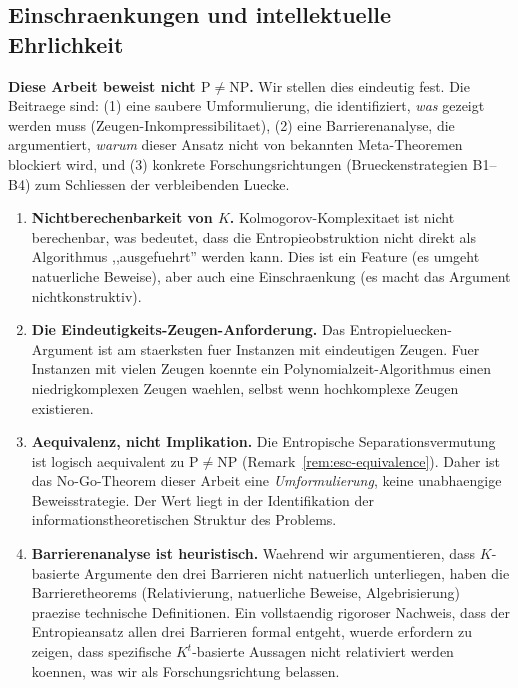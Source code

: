 \documentclass[aps,prd,twocolumn,superscriptaddress,nofootinbib]{revtex4-2}
\theoremstyle{definition}
\theoremstyle{remark}
\newcommand{\NP}{\mathrm{NP}}
\newcommand{\PP}{\mathrm{P}}
\begin{document}
\subsection{Einschraenkungen und intellektuelle Ehrlichkeit}

\textbf{Diese Arbeit beweist nicht $\PP \neq \NP$.} Wir stellen dies eindeutig fest. Die Beitraege sind: (1) eine saubere Umformulierung, die identifiziert, \textit{was} gezeigt werden muss (Zeugen-Inkompressibilitaet), (2) eine Barrierenanalyse, die argumentiert, \textit{warum} dieser Ansatz nicht von bekannten Meta-Theoremen blockiert wird, und (3) konkrete Forschungsrichtungen (Brueckenstrategien B1--B4) zum Schliessen der verbleibenden Luecke.

\begin{enumerate}
\item \textbf{Nichtberechenbarkeit von $K$.} Kolmogorov-Komplexitaet ist nicht berechenbar, was bedeutet, dass die Entropieobstruktion nicht direkt als Algorithmus ,,ausgefuehrt'' werden kann. Dies ist ein Feature (es umgeht natuerliche Beweise), aber auch eine Einschraenkung (es macht das Argument nichtkonstruktiv).

\item \textbf{Die Eindeutigkeits-Zeugen-Anforderung.} Das Entropieluecken-Argument ist am staerksten fuer Instanzen mit eindeutigen Zeugen. Fuer Instanzen mit vielen Zeugen koennte ein Polynomialzeit-Algorithmus einen niedrigkomplexen Zeugen waehlen, selbst wenn hochkomplexe Zeugen existieren.

\item \textbf{Aequivalenz, nicht Implikation.} Die Entropische Separationsvermutung ist logisch aequivalent zu $\PP \neq \NP$ (Remark~\ref{rem:esc-equivalence}). Daher ist das No-Go-Theorem dieser Arbeit eine \textit{Umformulierung}, keine unabhaengige Beweisstrategie. Der Wert liegt in der Identifikation der informationstheoretischen Struktur des Problems.

\item \textbf{Barrierenanalyse ist heuristisch.} Waehrend wir argumentieren, dass $K$-basierte Argumente den drei Barrieren nicht natuerlich unterliegen, haben die Barrieretheorems (Relativierung, natuerliche Beweise, Algebrisierung) praezise technische Definitionen. Ein vollstaendig rigoroser Nachweis, dass der Entropieansatz allen drei Barrieren formal entgeht, wuerde erfordern zu zeigen, dass spezifische $K^t$-basierte Aussagen nicht relativiert werden koennen, was wir als Forschungsrichtung belassen.
\end{enumerate}
\end{document}
